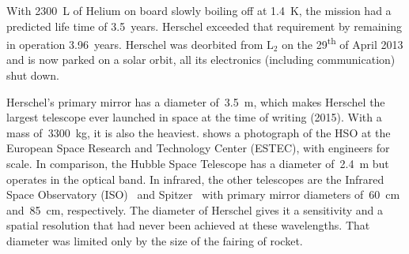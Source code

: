 With \SI{2300}{\liter} of Helium on board slowly boiling off at \SI{1.4}{\kelvin}, the mission had a predicted life time of 3.5~years.
Herschel exceeded that requirement by remaining in operation 3.96~years.
Herschel was deorbited from $\text{L}_2$ on the 29\textsuperscript{th} of April 2013 and is now parked on a solar orbit, all its electronics (including communication) shut down.



Herschel's primary mirror has a diameter of~\SI{3.5}{\meter}, which makes Herschel the largest telescope ever launched in space at the time of writing (2015).
With a mass of~\SI{3300}{\kilo\gram}, it is also the heaviest.
 shows a photograph of the HSO at the European Space Research and Technology Center (ESTEC), with engineers for scale.
In comparison, the Hubble Space Telescope has a diameter of~\SI{2.4}{\meter} but operates in the optical band.
In infrared, the other telescopes
are
the Infrared Space Observatory (ISO)~\parencite{isoHandbook1}
and
Spitzer~\parencite{werner2004spitzer}
with primary mirror diameters of~\SI{60}{\centi\meter} and~\SI{85}{\centi\meter}, respectively.
The diameter of Herschel gives it a sensitivity and a spatial resolution that had never been achieved at these wavelengths.
That diameter was limited only by the size of the fairing of rocket.








